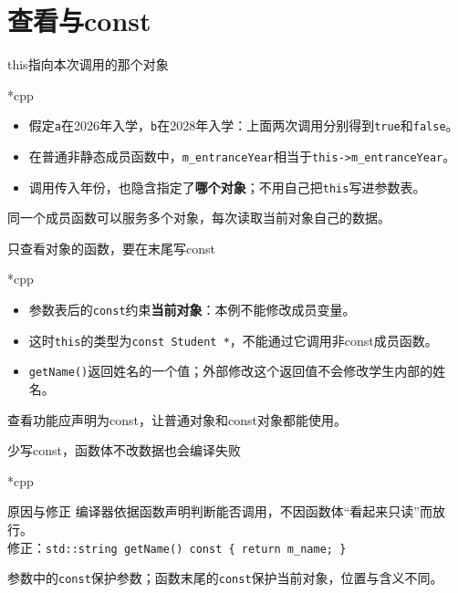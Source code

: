 \section{查看与const}

\begin{frame}{this指向本次调用的那个对象}
    \begin{Code}*{cpp}
        
    \end{Code}
    \begin{itemize}
        \item 假定\texttt{a}在2026年入学，\texttt{b}在2028年入学：上面两次调用分别得到\texttt{true}和\texttt{false}。
        \item 在普通非静态成员函数中，\texttt{m\_entranceYear}相当于\texttt{this->m\_entranceYear}。
        \item 调用传入年份，也隐含指定了\textbf{哪个对象}；不用自己把\texttt{this}写进参数表。
    \end{itemize}
    \alert{同一个成员函数可以服务多个对象，每次读取当前对象自己的数据。}
\end{frame}

\begin{frame}{只查看对象的函数，要在末尾写const}
    \begin{Code}*{cpp}
        
    \end{Code}
    \begin{itemize}
        \item 参数表后的\texttt{const}约束\textbf{当前对象}：本例不能修改成员变量。
        \item 这时\texttt{this}的类型为\texttt{const Student *}，不能通过它调用非const成员函数。
        \item \texttt{getName()}返回姓名的一个值；外部修改这个返回值不会修改学生内部的姓名。
    \end{itemize}
    \alert{查看功能应声明为const，让普通对象和const对象都能使用。}
\end{frame}

\begin{frame}{少写const，函数体不改数据也会编译失败}
    \begin{Code}*{cpp}
        
    \end{Code}
    \begin{vspquotered}{原因与修正}
        编译器依据函数声明判断能否调用，不因函数体“看起来只读”而放行。\\[5pt]
        修正：\texttt{std::string getName() const \{ return m\_name; \}}
    \end{vspquotered}
    \small 参数中的\texttt{const}保护参数；函数末尾的\texttt{const}保护当前对象，位置与含义不同。
\end{frame}

